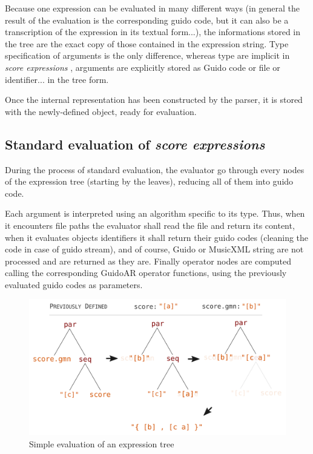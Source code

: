 \documentclass{article}
\newcommand{\sExpr}{\emph{score expressions} }
\begin{document}
Because one expression can be evaluated in many different ways (in general the result of the evaluation is the corresponding guido code, but it can also be a transcription of the expression in its textual form...), the informations stored in the tree are the exact copy of those contained in the expression string. Type specification of arguments is the only difference, whereas type are implicit in \sExpr, arguments are explicitly stored as Guido code or file or identifier... in the tree form. 

Once the internal representation has been constructed by the parser, it is stored with the newly-defined object, ready for evaluation.

\subsection{Standard evaluation of \sExpr}
During the process of standard evaluation, the evaluator go through every nodes of the expression tree (starting by the leaves), reducing all of them into guido code.

Each argument is interpreted using an algorithm specific to its type. Thus, when it encounters file paths the evaluator shall read the file and return its content, when it evaluates objects identifiers it shall return their guido codes (cleaning the code in case of guido stream), and of course, Guido or MusicXML string are not processed and are returned as they are. Finally operator nodes are computed calling the corresponding GuidoAR operator functions, using the previously evaluated guido codes as parameters.

\begin{figure}[th]
\centering
\includegraphics[width=1\columnwidth]{imgs/classicEval}
\caption{Simple evaluation of an expression tree
\label{fig:classicEval}}
\end{figure}
\end{document}
